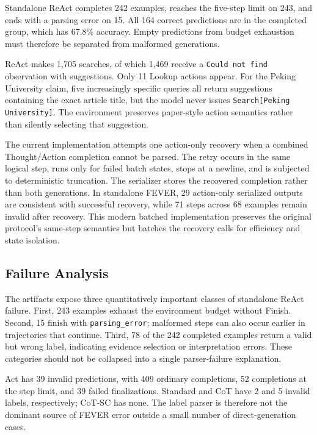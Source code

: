 \documentclass[10pt]{article}
\newcommand{\code}[1]{\texttt{#1}}
\begin{document}
Standalone ReAct completes 242 examples, reaches the five-step limit on 243, and ends with a parsing error on 15. All 164 correct predictions are in the completed group, which has 67.8\% accuracy. Empty predictions from budget exhaustion must therefore be separated from malformed generations.

ReAct makes 1,705 searches, of which 1,469 receive a \code{Could not find} observation with suggestions. Only 11 Lookup actions appear. For the Peking University claim, five increasingly specific queries all return suggestions containing the exact article title, but the model never issues \code{Search[Peking University]}. The environment preserves paper-style action semantics rather than silently selecting that suggestion.

The current implementation attempts one action-only recovery when a combined Thought/Action completion cannot be parsed. The retry occurs in the same logical step, runs only for failed batch states, stops at a newline, and is subjected to deterministic truncation. The serializer stores the recovered completion rather than both generations. In standalone FEVER, 29 action-only serialized outputs are consistent with successful recovery, while 71 steps across 68 examples remain invalid after recovery. This modern batched implementation preserves the original protocol's same-step semantics but batches the recovery calls for efficiency and state isolation.

\subsection{Failure Analysis}

The artifacts expose three quantitatively important classes of standalone ReAct failure. First, 243 examples exhaust the environment budget without Finish. Second, 15 finish with \code{parsing\_error}; malformed steps can also occur earlier in trajectories that continue. Third, 78 of the 242 completed examples return a valid but wrong label, indicating evidence selection or interpretation errors. These categories should not be collapsed into a single parser-failure explanation.

Act has 39 invalid predictions, with 409 ordinary completions, 52 completions at the step limit, and 39 failed finalizations. Standard and CoT have 2 and 5 invalid labels, respectively; CoT-SC has none. The label parser is therefore not the dominant source of FEVER error outside a small number of direct-generation cases.
\end{document}

